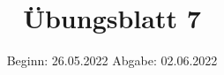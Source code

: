 

\title{Übungsblatt 7}
\date{%
  Beginn: 26.05.2022
  \hspace{3em}
  Abgabe: 02.06.2022
}



\maketitle
\thispagestyle{empty}
\tableofcontents
\newpage






